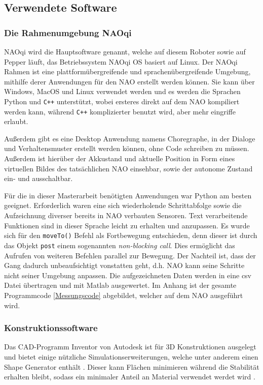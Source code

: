 \subsection{Verwendete Software} \label{software}
\subsubsection*{Die Rahmenumgebung NAOqi}
NAOqi wird die Hauptsoftware genannt, welche auf diesem Roboter sowie auf Pepper läuft, das Betriebssystem NAOqi OS basiert auf Linux. Der NAOqi Rahmen ist eine plattformübergreifende und sprachenübergreifende Umgebung, mithilfe derer Anwendungen für den NAO erstellt werden können. Sie kann über Windows, MacOS und Linux verwendet werden und es werden die Sprachen Python und \texttt{C++} unterstützt, wobei ersteres direkt auf dem NAO kompiliert werden kann, während \texttt{C++} komplizierter benutzt wird, aber mehr eingriffe erlaubt. \cite[/Former NAOqi Framework/Key concepts]{naoqi_dev_guide}

Außerdem gibt es eine Desktop Anwendung namens Choregraphe, in der Dialoge und Verhaltensmuster erstellt werden können, ohne Code schreiben zu müssen. Außerdem ist hierüber der Akkustand und aktuelle Position in Form eines virtuellen Bildes des tatsächlichen NAO einsehbar, sowie der autonome Zustand ein- und ausschaltbar. \cite[/Choregraphe Suite/What is Choregraphe]{naoqi_dev_guide}

Für die in dieser Masterarbeit benötigten Anwendungen war Python am besten geeignet. Erforderlich waren eine sich wiederholende Schrittabfolge sowie die Aufzeichnung diverser bereits in NAO verbauten Sensoren. Text verarbeitende Funktionen sind in dieser Sprache leicht zu erhalten und anzupassen. Es wurde sich für den \texttt{moveTo()} Befehl als Fortbewegung entschieden, denn dieser ist durch das Objekt \texttt{post} einem sogenannten \textit{non-blocking call}. Dies ermöglicht das Aufrufen von weiteren Befehlen parallel zur Bewegung. Der Nachteil ist, dass der Gang dadurch unbeaufsichtigt vonstatten geht, d.h. NAO kann seine Schritte nicht seiner Umgebung anpassen. Die aufgezeichneten Daten werden in eine csv Datei übertragen und mit Matlab ausgewertet. Im Anhang ist der gesamte Programmcode \ref{Messungscode} abgebildet, welcher auf dem NAO ausgeführt wird. 

\subsubsection*{Konstruktionssoftware}	
Das CAD-Programm Inventor von Autodesk ist für 3D Konstruktionen ausgelegt und bietet einige nützliche Simulationserweiterungen, welche unter anderem einen Shape Generator enthält \cite{inventor}. Dieser kann Flächen minimieren während die Stabilität erhalten bleibt, sodass ein minimaler Anteil an Material verwendet werdet wird \cite{shape_generator}. 

